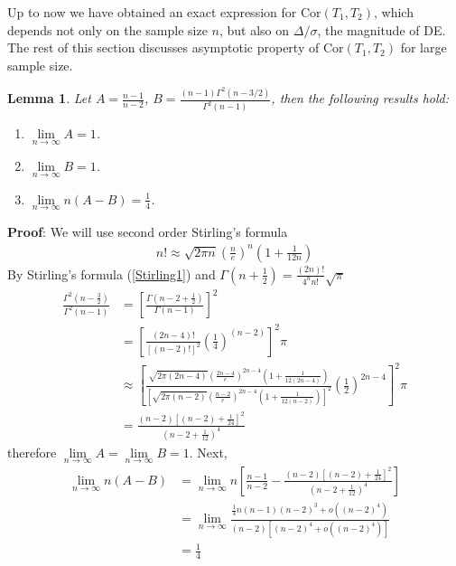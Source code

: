 \documentclass[11pt, a4paper]{article}
\newtheorem{lemma}{Lemma}
\begin{document}
Up to now we have obtained an exact expression for $\text{Cor}(T_1, T_2)$, which depends not only on the sample size $n$, but also on $\Delta/\sigma$, the magnitude of DE. The rest of this section discusses asymptotic  property of $\text{Cor}(T_1, T_2)$ for large sample size.
\begin{lemma}\label{lemmaLimit}
	Let $A = \frac{n-1}{n-2}$, $B= \frac{(n-1)\Gamma^2(n-3/2)}{\Gamma^2(n-1)}$, then the following results hold:
	\begin{enumerate}
		\item $\lim\limits_{n\rightarrow \infty} A = 1$.
		\item $\lim\limits_{n\rightarrow \infty} B = 1$.
		\item $\lim\limits_{n\rightarrow \infty} n(A-B) = \frac{1}{4}$. 
	\end{enumerate}
\end{lemma}
\textbf{Proof}: We will use second order Stirling's formula
\begin{align}\label{Stirling1}
n! \approx \sqrt{2\pi n}\left(\frac{n}{e}\right)^n(1 + \frac{1}{12n})
\end{align}
By Stirling's formula (\ref{Stirling1}) and  $\Gamma(n + \frac{1}{2}) = \frac{(2n)!}{4^nn!}\sqrt{\pi}$ 
\begin{align*}
\frac{\Gamma^2(n - \frac{3}{2}) }{\Gamma^2(n-1)} & =\left[\frac{\Gamma(n -2 + \frac{1}{2})}{\Gamma(n-1)}\right]^2\\
&  = \left[\frac{(2n-4)!}{[(n-2)!]^2}\left(\frac{1}{4}\right)^{(n-2)}\right]^2\pi\\
& \approx \left[\frac{\sqrt{2\pi(2n-4)}\left(\frac{2n-4}{e}\right)^{2n-4}\left(1 + \frac{1}{12(2n-4)}\right)}{\left[\sqrt{2\pi(n-2)}\left(\frac{n-2}{e}\right)^{2n-4}\left(1 + \frac{1}{12(n-2)}\right)\right]^2}\left(\frac{1}{2}\right)^{2n-4}\right]^2\pi \\
& = \frac{(n-2)\left[(n-2) + \frac{1}{24}\right]^2}{(n-2 + \frac{1}{12})^4}
\end{align*}
therefore $\lim\limits _{n\rightarrow\infty}A = \lim\limits_{n\rightarrow\infty}B = 1$. Next, 
\begin{align*}
\lim\limits_{n\rightarrow \infty} n(A-B)& =\lim\limits_{n\rightarrow \infty} n\left[\frac{n-1}{n-2} - \frac{(n-2)\left[(n-2) + \frac{1}{24}\right]^2}{(n-2 + \frac{1}{12})^4}\right]\\
& = \lim\limits_{n\rightarrow \infty}  \frac{\frac{1}{4} n(n-1)(n-2)^3 + o\left((n-2)^4\right)}{(n-2)\left[(n-2)^4 +  o\left((n-2)^4\right)\right]}\\
&= \frac{1}{4}
\end{align*}
\end{document}
